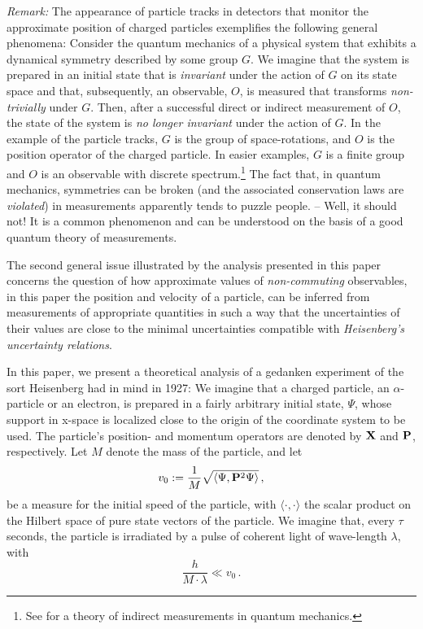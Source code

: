 \documentclass[11pt]{article}
\begin{document}
\textit{Remark:} The appearance of particle tracks in detectors that monitor the approximate position of charged particles
exemplifies the following general phenomena: Consider the quantum mechanics of a physical system that exhibits a
 dynamical symmetry described by some group $G$. We imagine that the system is prepared in an initial state that is
 \textit{invariant} under the action of $G$ on its state space and that, subsequently, an observable, $O$, is measured that
transforms \textit{non-trivially} under $G$. Then, after a successful direct or indirect measurement of $O$, the state of the
system is \textit{no longer invariant} under the action of $G$. In the example of the particle tracks, $G$ is the group of
space-rotations, and $O$ is the position operator of the charged particle. In easier examples, $G$ is a finite group and
$O$ is an observable with discrete spectrum.\footnote{See \cite{MK, BB, BBB, BFFS} for a theory of indirect measurements in quantum mechanics.} The fact that, in quantum mechanics, symmetries can be broken 
(and the associated conservation laws are \textit{violated}) in measurements apparently tends to
puzzle people. -- Well, it should not! It is a common phenomenon and can be understood on the basis of a 
good quantum theory of measurements. 

The second general issue illustrated by the analysis presented in this paper concerns
 the question of how approximate values of \textit{non-commuting} observables, in this paper the position and velocity 
 of a particle, can be inferred from measurements of appropriate quantities in such a way that the uncertainties of their 
 values are close to the minimal uncertainties compatible with \textit{Heisenberg's uncertainty relations}. 
 
In this paper, we present a theoretical analysis of a gedanken experiment of the sort Heisenberg  had in mind in 1927: 
We imagine that a charged particle, an $\alpha$-particle or an electron, is prepared in a fairly arbitrary initial state, $\Psi$, 
whose support in x-space is localized close to the origin of the coordinate system to be used. The particle's position- and 
momentum operators are denoted by ${\bf{X}}$ and ${\bf{P}}$, respectively. Let $M$ denote the mass of the particle, 
and let 
\begin{equation}\label{initial state}
v_0:= \frac{1}{M} \sqrt{\langle \Psi, {\bf{P}}^{2} \Psi \rangle}\,,
\end{equation}
be a measure for the initial speed of the particle, with $\langle \cdot ,\cdot \rangle$ the scalar product on the Hilbert space of pure state vectors of the particle. We imagine that, 
every $\tau$ seconds, the particle is irradiated by a pulse of coherent light of wave-length $\lambda$, with 
\begin{equation}\label{speed}
\frac{h}{M\cdot \lambda} \ll v_0\,.
\end{equation}
\end{document}
